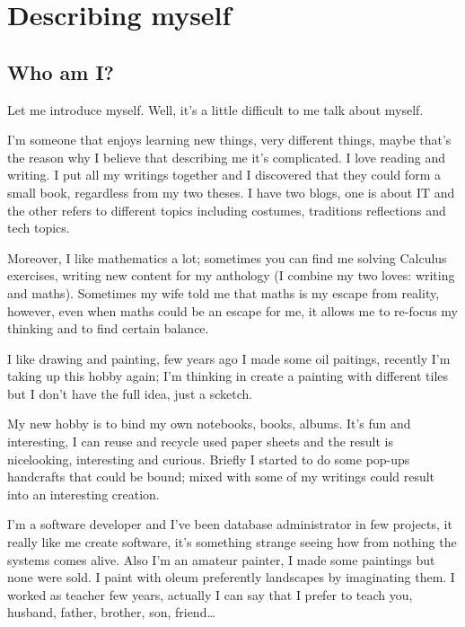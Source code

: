 \section{Describing myself}

\subsection{Who am I?}
\begin{multicols}{2}
Let me introduce myself. Well, it's a little difficult to me talk about myself.

I'm someone that enjoys learning new things, very different things, maybe that's the reason why I believe that describing me it's complicated. I love reading and writing. I put all my writings together and I discovered that they could form a small book, regardless from my two theses. I have two blogs, one is about IT and the other refers to different topics including costumes, traditions reflections and tech topics.

Moreover, I like mathematics a lot; sometimes you can find me solving Calculus exercises, writing new content for my anthology (I combine my two loves: writing and maths). Sometimes my wife told me that maths is my escape from reality, however, even when maths could be an escape for me, it allows me to re-focus my thinking and to find certain balance.

I like drawing and painting, few years ago I made some oil paitings, recently I'm taking up this hobby again; I'm thinking in create a painting with different tiles but I don't have the full idea, just a scketch.

My new hobby is to bind my own notebooks, books, albums. It's fun and interesting, I can reuse and recycle used paper sheets and the result is nicelooking, interesting and curious. Briefly I started to do some pop-ups handcrafts that could be bound; mixed with some of my writings could result into an interesting creation.

I'm a software developer and I've been database administrator in few projects, it really like me create software, it's something strange seeing how from nothing the systems comes alive. Also I'm an amateur painter, I made some paintings but none were sold. I paint with oleum preferently landscapes by imaginating them. I worked as teacher few years, actually I can say that I prefer to teach you, husband, father, brother, son, friend\dots
\end{multicols}

